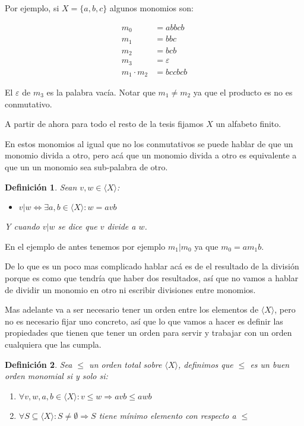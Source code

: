 \documentclass{report}
\theoremstyle{customstyle}
\newtheorem{definition}{Definición}[chapter]
\theoremstyle{factstyle}
\begin{document}
Por ejemplo, si $X = \{a, b, c\}$ algunos monomios son:

\begin{align*}
  m_0 &= abbcb \\
  m_1 &= bbc \\
  m_2 &= bcb \\
  m_3 &= ε \\
  m_1 · m_2 &= bccbcb
\end{align*}

El $ε$ de $m_3$ es la palabra vacía. Notar que $m_1 ≠ m_2$ ya que el producto es no es conmutativo.

A partir de ahora para todo el resto de la tesis fijamos $X$ un alfabeto finito.

En estos monomios al igual que no los conmutativos se puede hablar de que un monomio divida a otro, pero acá que un monomio divida a otro es equivalente a que un un monomio sea sub-palabra de otro.

\begin{definition}
  Sean $v, w ∈ ⟨X⟩$:
  \begin{itemize}
    \item $v | w ⇔ ∃a , b ∈ ⟨X⟩ : w = avb$
  \end{itemize}
  Y cuando $v | w$ se dice que $v$ divide a $w$.
\end{definition}

En el ejemplo de antes tenemos por ejemplo $m_1 | m_0$ ya que $m_0 = a m_1 b$.

De lo que es un poco mas complicado hablar acá es de el resultado de la división porque es como que tendría que haber dos resultados, así que no vamos a hablar de dividir un monomio en otro ni escribir divisiones entre monomios.

Mas adelante va a ser necesario tener un orden entre los elementos de $⟨X⟩$, pero no es necesario fijar uno concreto, así que lo que vamos a hacer es definir las propiedades que tienen que tener un orden para servir y trabajar con un orden cualquiera que las cumpla.

\begin{definition}
  Sea $≤$ un orden total sobre $⟨X⟩$, definimos que $≤$ es un buen orden monomial si y solo si:
  \begin{enumerate}
    \item $∀v, w, a, b ∈ ⟨X⟩ : v ≤ w ⇒ avb ≤ awb$
    \item $∀S ⊆ ⟨X⟩ : S ≠ ∅ ⇒ S$ tiene mínimo elemento con respecto a $≤$
  \end{enumerate}
\end{definition}
\end{document}
